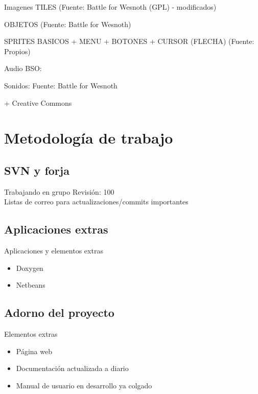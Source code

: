 \documentclass[9pt,xcolor=svgnames]{beamer}
\begin{document}
  \begin{frame}{Imagenes}
   TILES (Fuente: Battle for Wesnoth (GPL) - modificados)
   
   OBJETOS (Fuente: Battle for Wesnoth)
   
   SPRITES BASICOS + MENU + BOTONES + CURSOR (FLECHA) (Fuente: Propios)
  \end{frame}
  
  \begin{frame}{Audio}
   BSO: 
   
   Sonidos: Fuente: Battle for Wesnoth
   
   + Creative Commons
  \end{frame}
  
  
 \section{Metodología de trabajo}
 
  \subsection{SVN y forja}
  
  \begin{frame}{Trabajando en grupo}
   Revisión: 100\\
   
   Listas de correo para actualizaciones/commits importantes
  \end{frame}
  
  
  
  \subsection{Aplicaciones extras}
  
  \begin{frame}{Aplicaciones y elementos extras}
   \begin{itemize}
    \item Doxygen
    \item Netbeans
   \end{itemize}
  \end{frame}
  

  \subsection{Adorno del proyecto}
  
  \begin{frame}{Elementos extras}
   \begin{itemize}
    \item Página web
    \item Documentación actualizada a diario
    \item Manual de usuario en desarrollo ya colgado
   \end{itemize}
  \end{frame}
  
\end{document}
